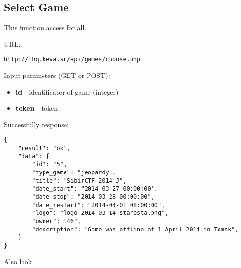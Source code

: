 \subsection{Select Game}
\par

This function access for all.

URL:
\begin{Verbatim}[frame=single]
http://fhq.keva.su/api/games/choose.php
\end{Verbatim}

Input parameters (GET or POST):
\begin{itemize}
  \item \textbf{id} - identificator of game (integer)
  \item \textbf{token} - token  
\end{itemize}

Successfully response:  \\
\begin{Verbatim}[frame=single]
{
    "result": "ok",
    "data": {
        "id": "5",
        "type_game": "jeopardy",
        "title": "SibirCTF 2014 J",
        "date_start": "2014-03-27 00:00:00",
        "date_stop": "2014-03-28 00:00:00",
        "date_restart": "2014-04-01 08:00:00",
        "logo": "logo_2014-03-14_starosta.png",
        "owner": "46",
        "description": "Game was offline at 1 April 2014 in Tomsk",
    }
}
\end{Verbatim}

Also look ~
